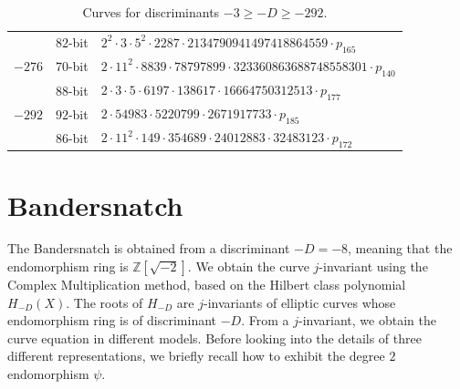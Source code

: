 \documentclass[smallextended]{svjour3}
\newcommand{\Z}{\ensuremath{\mathbb Z}}
\begin{document}
\begin{table}[!ht]
\begin{tabularx}{\textwidth}{ccl}
 & $82$-bit & $2^{2}  \cdot 3  \cdot 5^{2}  \cdot 2287  \cdot 2134790941497418864559  \cdot p_{165}$\\
$-276$ & $70$-bit & $2  \cdot 11^{2}  \cdot 8839  \cdot 78797899  \cdot 323360863688748558301  \cdot p_{140}$\\
 & $88$-bit & $2  \cdot 3  \cdot 5  \cdot 6197  \cdot 138617  \cdot 16664750312513  \cdot p_{177}$\\
$-292$ & $92$-bit & $2  \cdot 54983  \cdot 5220799  \cdot 2671917733  \cdot p_{185}$\\
 & $86$-bit & $2  \cdot 11^{2}  \cdot 149  \cdot 354689  \cdot
24012883  \cdot 32483123  \cdot p_{172}$\\
    \end{tabularx}
    \caption{Curves for discriminants $-3 \geq -D \geq -292$.}
    \label{tab:group-order-factorization}
\end{table}

\section{Bandersnatch}\label{sec:bandersnatch}

The Bandersnatch is obtained from a discriminant $-D = -8$, meaning
that the endomorphism ring is $\Z[\sqrt{-2}]$.
We obtain the curve $j$-invariant using the Complex Multiplication
method, based on the Hilbert class polynomial $H_{-D}(X)$.
The roots of $H_{-D}$ are $j$-invariants of elliptic curves whose
endomorphism ring is of discriminant $-D$.
From a $j$-invariant, we obtain the curve equation in different
models. Before looking into the details of three different representations,
we briefly recall how to exhibit the degree $2$ endomorphism $\psi$.
\end{document}

